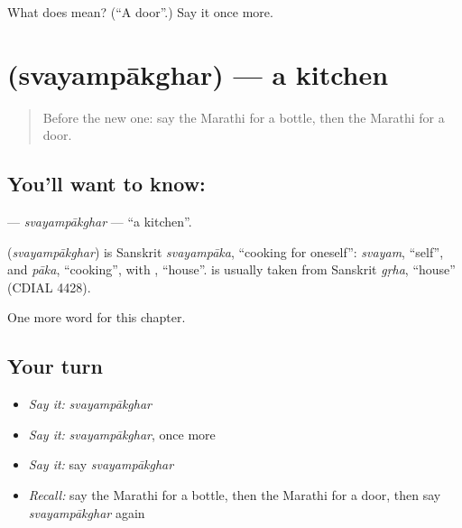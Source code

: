 \begin{tcolorbox}[breakable,colback=teal!4,colframe=teal!35!black,title={Before you move on}]
What does  mean? (\textquotedblleft{}A door\textquotedblright{}.) Say it once more.
\end{tcolorbox}
\section[\texorpdfstring{\mr{स्वयंपाकघर} (svayampākghar)}{स्वयंपाकघर (svayampākghar)}]{ (svayampākghar) — a kitchen}

\label{lesson:MR-C93-svayampakghar}



\begin{quote}
Before the new one: say the Marathi for a bottle, then the Marathi for a door.
\end{quote}

\subsection*{You'll want to know: }
\textbf{} — \emph{svayampākghar} — \textquotedblleft{}a kitchen\textquotedblright{}.

\begin{cousinweb}
\textbf{} (\emph{svayampākghar}) is Sanskrit \emph{svayampāka}, \textquotedblleft{}cooking for oneself\textquotedblright{}: \emph{svayam}, \textquotedblleft{}self\textquotedblright{}, and \emph{pāka}, \textquotedblleft{}cooking\textquotedblright{}, with \textbf{}, \textquotedblleft{}house\textquotedblright{}. \textbf{} is usually taken from Sanskrit \emph{gṛha}, \textquotedblleft{}house\textquotedblright{} (CDIAL 4428).
\end{cousinweb}

\begin{grammarlens}[title={What you've built}]
One more word for this chapter.
\end{grammarlens}

\subsection*{Your turn}
\begin{itemize}
\raggedright
  \item \emph{Say it:} \emph{svayampākghar}
  \item \emph{Say it:} \emph{svayampākghar}, once more
  \item \emph{Say it:} say \emph{svayampākghar}
  \item \emph{Recall:} say the Marathi for a bottle, then the Marathi for a door, then say \emph{svayampākghar} again
\end{itemize}

